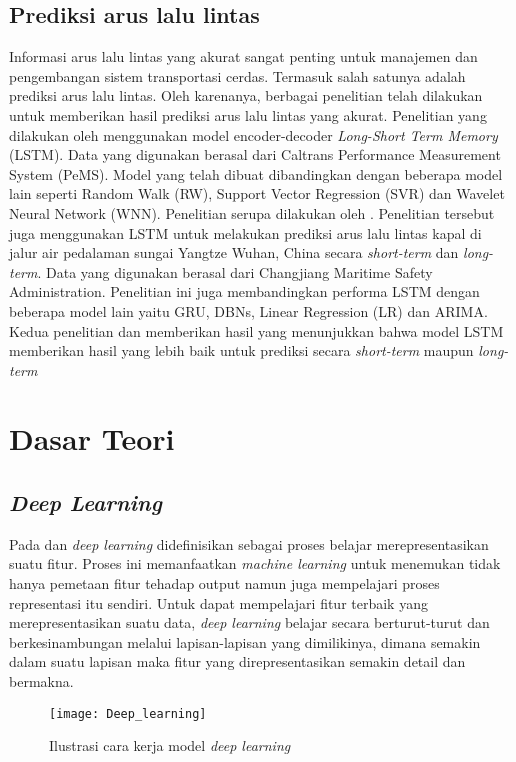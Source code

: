 \documentclass[../thesis.tex]{subfiles}
\begin{document}
\subsection{Prediksi arus lalu lintas}
Informasi arus lalu lintas yang akurat sangat penting untuk manajemen dan pengembangan sistem transportasi cerdas. Termasuk salah satunya adalah prediksi arus lalu lintas. Oleh karenanya, berbagai penelitian telah dilakukan untuk memberikan hasil prediksi arus lalu lintas yang akurat.
Penelitian yang dilakukan oleh \cite{LSTM_2} menggunakan model encoder-decoder \textit{Long-Short Term Memory} (LSTM). Data yang digunakan berasal dari Caltrans Performance Measurement System (PeMS). Model yang telah dibuat dibandingkan dengan beberapa model lain seperti Random Walk (RW), Support Vector Regression (SVR) dan Wavelet Neural Network (WNN). 
Penelitian serupa dilakukan oleh \cite{LSTM_1}. Penelitian tersebut juga menggunakan LSTM untuk melakukan prediksi arus lalu lintas kapal di jalur air pedalaman sungai Yangtze Wuhan, China secara \textit{short-term} dan \textit{long-term}. Data yang digunakan berasal dari Changjiang Maritime Safety Administration. Penelitian ini juga membandingkan performa LSTM dengan beberapa model lain yaitu GRU, DBNs, Linear Regression (LR) dan ARIMA.
Kedua penelitian \cite{LSTM_1} dan \cite{LSTM_2} memberikan hasil yang menunjukkan bahwa model LSTM memberikan hasil yang lebih baik untuk prediksi secara \textit{short-term} maupun \textit{long-term}

\section{Dasar Teori}
\subsection{\textit{Deep Learning}}
Pada \cite{DLConcept} dan \cite{DLwithPython} \textit{deep learning} didefinisikan sebagai proses belajar merepresentasikan suatu fitur. Proses ini memanfaatkan \textit{machine learning} untuk menemukan tidak hanya pemetaan fitur tehadap output namun juga mempelajari proses representasi itu sendiri.
Untuk dapat mempelajari fitur terbaik yang merepresentasikan suatu data, \textit{deep learning} belajar secara berturut-turut dan berkesinambungan melalui lapisan-lapisan yang dimilikinya, dimana semakin dalam suatu lapisan maka fitur yang direpresentasikan semakin detail dan bermakna.

\begin{figure}
	\centering
	\texttt{[image: Deep\_learning]}
	\caption{Ilustrasi cara kerja model \textit{deep learning}}
	\label{Dl_model}
\end{figure}
\end{document}
